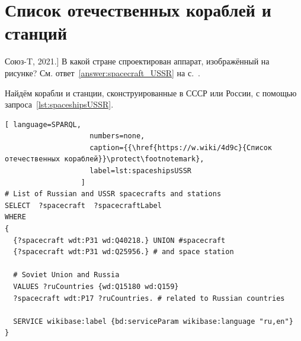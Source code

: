 \section{Список отечественных кораблей и станций}

\begin{marginfigure}
{
	\setlength{\fboxsep}{0pt}%
	\setlength{\fboxrule}{1pt}%
}
\caption
[Союз-T, 2021.]
{
В какой стране спроектирован аппарат, изображённый на рисунке?
См. ответ~\ref{answer:spacecraft_USSR} на с.~\pageref{answer:spacecraft_USSR}.
}
\label{question:spacecraft_soyuzT}
\end{marginfigure}

Найдём корабли и станции, сконструированные в СССР или России, 
с помощью запроса~\ref{lst:spaceshipsUSSR}.

\begin{lstlisting}[ language=SPARQL, 
                    numbers=none, 
                    caption={{\href{https://w.wiki/4d9c}{Список отечественных кораблей}}\protect\footnotemark}, 
                    label=lst:spaceshipsUSSR
                  ]
# List of Russian and USSR spacecrafts and stations
SELECT  ?spacecraft  ?spacecraftLabel 
WHERE
{
  {?spacecraft wdt:P31 wd:Q40218.} UNION #spacecraft
  {?spacecraft wdt:P31 wd:Q25956.} # and space station
  
  # Soviet Union and Russia
  VALUES ?ruCountries {wd:Q15180 wd:Q159}
  ?spacecraft wdt:P17 ?ruCountries. # related to Russian countries
  
  SERVICE wikibase:label {bd:serviceParam wikibase:language "ru,en"}
}
\end{lstlisting}


